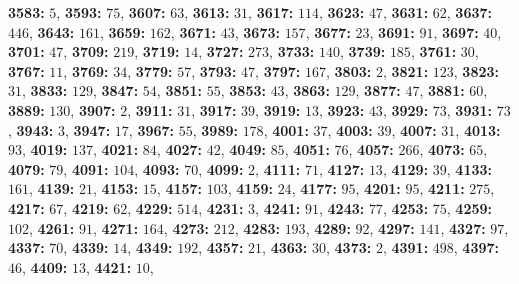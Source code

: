 \textsf{\bfseries 3583:} $5$, \textsf{\bfseries 3593:} $75$, \textsf{\bfseries 3607:} $63$, \textsf{\bfseries 3613:} $31$, \textsf{\bfseries 3617:} $114$, \textsf{\bfseries 3623:} $47$, \textsf{\bfseries 3631:} $62$, \textsf{\bfseries 3637:} $446$, \textsf{\bfseries 3643:} $161$, \textsf{\bfseries 3659:} $162$, \textsf{\bfseries 3671:} $43$, \textsf{\bfseries 3673:} $157$, \textsf{\bfseries 3677:} $23$, \textsf{\bfseries 3691:} $91$, \textsf{\bfseries 3697:} $40$, \textsf{\bfseries 3701:} $47$, \textsf{\bfseries 3709:} $219$, \textsf{\bfseries 3719:} $14$, \textsf{\bfseries 3727:} $273$, \textsf{\bfseries 3733:} $140$, \textsf{\bfseries 3739:} $185$, \textsf{\bfseries 3761:} $30$, \textsf{\bfseries 3767:} $11$, \textsf{\bfseries 3769:} $34$, \textsf{\bfseries 3779:} $57$, \textsf{\bfseries 3793:} $47$, \textsf{\bfseries 3797:} $167$, \textsf{\bfseries 3803:} $2$, \textsf{\bfseries 3821:} $123$, \textsf{\bfseries 3823:} $31$, \textsf{\bfseries 3833:} $129$, \textsf{\bfseries 3847:} $54$, \textsf{\bfseries 3851:} $55$, \textsf{\bfseries 3853:} $43$, \textsf{\bfseries 3863:} $129$, \textsf{\bfseries 3877:} $47$, \textsf{\bfseries 3881:} $60$, \textsf{\bfseries 3889:} $130$, \textsf{\bfseries 3907:} $2$, \textsf{\bfseries 3911:} $31$, \textsf{\bfseries 3917:} $39$, \textsf{\bfseries 3919:} $13$, \textsf{\bfseries 3923:} $43$, \textsf{\bfseries 3929:} $73$, \textsf{\bfseries 3931:} $73$, \textsf{\bfseries 3943:} $3$, \textsf{\bfseries 3947:} $17$, \textsf{\bfseries 3967:} $55$, \textsf{\bfseries 3989:} $178$, \textsf{\bfseries 4001:} $37$, \textsf{\bfseries 4003:} $39$, \textsf{\bfseries 4007:} $31$, \textsf{\bfseries 4013:} $93$, \textsf{\bfseries 4019:} $137$, \textsf{\bfseries 4021:} $84$, \textsf{\bfseries 4027:} $42$, \textsf{\bfseries 4049:} $85$, \textsf{\bfseries 4051:} $76$, \textsf{\bfseries 4057:} $266$, \textsf{\bfseries 4073:} $65$, \textsf{\bfseries 4079:} $79$, \textsf{\bfseries 4091:} $104$, \textsf{\bfseries 4093:} $70$, \textsf{\bfseries 4099:} $2$, \textsf{\bfseries 4111:} $71$, \textsf{\bfseries 4127:} $13$, \textsf{\bfseries 4129:} $39$, \textsf{\bfseries 4133:} $161$, \textsf{\bfseries 4139:} $21$, \textsf{\bfseries 4153:} $15$, \textsf{\bfseries 4157:} $103$, \textsf{\bfseries 4159:} $24$, \textsf{\bfseries 4177:} $95$, \textsf{\bfseries 4201:} $95$, \textsf{\bfseries 4211:} $275$, \textsf{\bfseries 4217:} $67$, \textsf{\bfseries 4219:} $62$, \textsf{\bfseries 4229:} $514$, \textsf{\bfseries 4231:} $3$, \textsf{\bfseries 4241:} $91$, \textsf{\bfseries 4243:} $77$, \textsf{\bfseries 4253:} $75$, \textsf{\bfseries 4259:} $102$, \textsf{\bfseries 4261:} $91$, \textsf{\bfseries 4271:} $164$, \textsf{\bfseries 4273:} $212$, \textsf{\bfseries 4283:} $193$, \textsf{\bfseries 4289:} $92$, \textsf{\bfseries 4297:} $141$, \textsf{\bfseries 4327:} $97$, \textsf{\bfseries 4337:} $70$, \textsf{\bfseries 4339:} $14$, \textsf{\bfseries 4349:} $192$, \textsf{\bfseries 4357:} $21$, \textsf{\bfseries 4363:} $30$, \textsf{\bfseries 4373:} $2$, \textsf{\bfseries 4391:} $498$, \textsf{\bfseries 4397:} $46$, \textsf{\bfseries 4409:} $13$, \textsf{\bfseries 4421:} $10$, 
